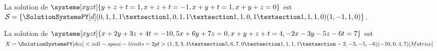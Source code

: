 \documentclass[french,a4paper,10pt]{article}
\begin{document}
\begin{ShowCodeTeX}
La solution de $\systeme[xyzt]{y+z+t=1,x+z+t=-1,x+y+t=1,x+y+z=0}$ est $\mathcal{S}=%
\left\lbrace\SolutionSystemePY[d](0,1,1,1 § 1,0,1,1 § 1,1,0,1 § 1,1,1,0)(1,-1,1,0)\right\rbrace$.
\end{ShowCodeTeX}

\begin{ShowCodeTeX}
La solution de $\systeme[xyzt]{x+2y+3z+4t=-10,5x+6y+7z=0,x+y+z+t=4,-2x-3y-5z-6t=7}$ est $X=
\SolutionSystemePY
    [dec]<cell-space-limits=2pt>
    (1,2,3,4 § 5,6,7,0 § 1,1,1,1 § -2,-3,-5,-6)(-10,0,4,7)
    [Matrice]$
\end{ShowCodeTeX}
\end{document}

